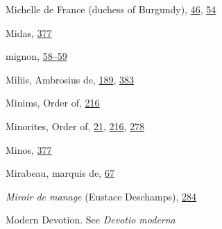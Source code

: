 Michelle de France (duchess of Burgundy),
\protect\hyperlink{09_Chapter_Two__THE_CRAVING_FOR_A_M.xhtmlux5cux23page_46}{46},
\protect\hyperlink{09_Chapter_Two__THE_CRAVING_FOR_A_M.xhtmlux5cux23page_54}{54}

Midas,
\protect\hyperlink{21_Chapter_Thirteen__IMAGE_AND_WORD.xhtmlux5cux23page_377}{377}

mignon,
\protect\hyperlink{09_Chapter_Two__THE_CRAVING_FOR_A_M.xhtmlux5cux23page_58}{58--}\protect\hyperlink{09_Chapter_Two__THE_CRAVING_FOR_A_M.xhtmlux5cux23page_59}{59}

Miliis, Ambrosius de,
\protect\hyperlink{13_Chapter_Six__THE_DEPICTION_OF_TH.xhtmlux5cux23page_189}{189},
\protect\hyperlink{22_Chapter_Fourteen__THE_COMING_OF.xhtmlux5cux23page_383}{383}

Minims, Order of,
\protect\hyperlink{14_Chapter_Seven__THE_PIOUS_PERSONA.xhtmlux5cux23page_216}{216}

Minorites, Order of,
\protect\hyperlink{08_Chapter_One__THE_PASSIONATE_INTE.xhtmlux5cux23page_21}{21},
\protect\hyperlink{14_Chapter_Seven__THE_PIOUS_PERSONA.xhtmlux5cux23page_216}{216},
\protect\hyperlink{18_Chapter_Eleven__THE_FORMS_OF_THO.xhtmlux5cux23page_278}{278}

Minos,
\protect\hyperlink{21_Chapter_Thirteen__IMAGE_AND_WORD.xhtmlux5cux23page_377}{377}

Mirabeau, marquis de,
\protect\hyperlink{10_Chapter_Three__THE_HEROIC_DREAM.xhtmlux5cux23page_67}{67}

\emph{Miroir de manage} (Eustace Deschamps),
\protect\hyperlink{18_Chapter_Eleven__THE_FORMS_OF_THO.xhtmlux5cux23page_284}{284}

Modern Devotion. See \emph{Devotio moderna}

